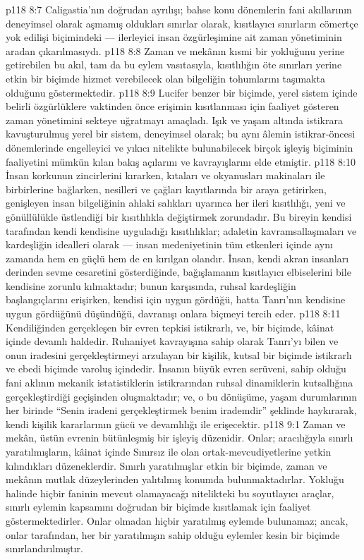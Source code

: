 \vs p118 8:7 Caligastia’nın doğrudan ayrılışı; bahse konu dönemlerin fani akıllarının deneyimsel olarak aşmamış oldukları sınırlar olarak, kısıtlayıcı sınırların cömertçe yok edilişi biçimindeki --- ilerleyici insan özgürleşimine ait zaman yönetiminin aradan çıkarılmasıydı.
\vs p118 8:8 Zaman ve mekânın kısmi bir yokluğunu yerine getirebilen bu akıl, tam da bu eylem vasıtasıyla, kısıtlılığın öte sınırları yerine etkin bir biçimde hizmet verebilecek olan bilgeliğin tohumlarını taşımakta olduğunu göstermektedir.
\vs p118 8:9 Lucifer benzer bir biçimde, yerel sistem içinde belirli özgürlüklere vaktinden önce erişimin kısıtlanması için faaliyet gösteren zaman yönetimini sekteye uğratmayı amaçladı. Işık ve yaşam altında istikrara kavuşturulmuş yerel bir sistem, deneyimsel olarak; bu aynı âlemin istikrar\hyp{}öncesi dönemlerinde engelleyici ve yıkıcı nitelikte bulunabilecek birçok işleyiş biçiminin faaliyetini mümkün kılan bakış açılarını ve kavrayışlarını elde etmiştir.
\vs p118 8:10 İnsan korkunun zincirlerini kırarken, kıtaları ve okyanusları makinaları ile birbirlerine bağlarken, nesilleri ve çağları kayıtlarında bir araya getirirken, genişleyen insan bilgeliğinin ahlaki salıkları uyarınca her ileri kısıtlılığı, yeni ve gönüllülükle üstlendiği bir kısıtlılıkla değiştirmek zorundadır. Bu bireyin kendisi tarafından kendi kendisine uyguladığı kısıtlılıklar; adaletin kavramsallaşmaları ve kardeşliğin idealleri olarak --- insan medeniyetinin tüm etkenleri içinde aynı zamanda hem en güçlü hem de en kırılgan olandır. İnsan, kendi akran insanları derinden sevme cesaretini gösterdiğinde, bağışlamanın kısıtlayıcı elbiselerini bile kendisine zorunlu kılmaktadır; bunun karşısında, ruhsal kardeşliğin başlangıçlarını erişirken, kendisi için uygun gördüğü, hatta Tanrı’nın kendisine uygun gördüğünü düşündüğü, davranışı onlara biçmeyi tercih eder.
\vs p118 8:11 Kendiliğinden gerçekleşen bir evren tepkisi istikrarlı, ve, bir biçimde, kâinat içinde devamlı haldedir. Ruhaniyet kavrayışına sahip olarak Tanrı’yı bilen ve onun iradesini gerçekleştirmeyi arzulayan bir kişilik, kutsal bir biçimde istikrarlı ve ebedi biçimde varoluş içindedir. İnsanın büyük evren serüveni, sahip olduğu fani aklının mekanik istatistiklerin istikrarından ruhsal dinamiklerin kutsallığına gerçekleştirdiği geçişinden oluşmaktadır; ve, o bu dönüşüme, yaşam durumlarının her birinde “Senin iradeni gerçekleştirmek benim irademdir” şeklinde haykırarak, kendi kişilik kararlarının gücü ve devamlılığı ile erişecektir.
\vs p118 9:1 Zaman ve mekân, üstün evrenin bütünleşmiş bir işleyiş düzenidir. Onlar; aracılığıyla sınırlı yaratılmışların, kâinat içinde Sınırsız ile olan ortak\hyp{}mevcudiyetlerine yetkin kılındıkları düzeneklerdir. Sınırlı yaratılmışlar etkin bir biçimde, zaman ve mekânın mutlak düzeylerinden yalıtılmış konumda bulunmaktadırlar. Yokluğu halinde hiçbir faninin mevcut olamayacağı nitelikteki bu soyutlayıcı araçlar, sınırlı eylemin kapsamını doğrudan bir biçimde kısıtlamak için faaliyet göstermektedirler. Onlar olmadan hiçbir yaratılmış eylemde bulunamaz; ancak, onlar tarafından, her bir yaratılmışın sahip olduğu eylemler kesin bir biçimde sınırlandırılmıştır.
